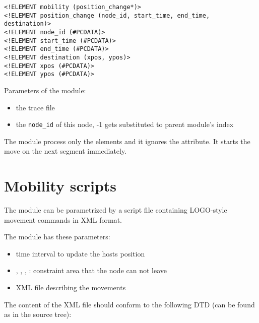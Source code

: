 \begin{description}
\begin{verbatim}
<!ELEMENT mobility (position_change*)>
<!ELEMENT position_change (node_id, start_time, end_time, destination)>
<!ELEMENT node_id (#PCDATA)>
<!ELEMENT start_time (#PCDATA)>
<!ELEMENT end_time (#PCDATA)>
<!ELEMENT destination (xpos, ypos)>
<!ELEMENT xpos (#PCDATA)>
<!ELEMENT ypos (#PCDATA)>
\end{verbatim}

Parameters of the module:

\begin{itemize}
  \item {} the trace file
  \item {} the \verb!node_id! of this node, -1 gets substituted to
  parent module's index
\end{itemize}

\begin{note}
The  module process only the 
elements and it ignores the  attribute. It starts the move
on the next segment immediately.
\end{note}

 
\end{description}




\section{Mobility scripts}

The  module can be parametrized by a script file
containing LOGO-style movement commands in XML format.

The module has these parameters:

\begin{itemize}
\item {} time interval to update the hosts position
\item {}, , ,
      : constraint area that the node can not leave
\item {} XML file describing the movements
\end{itemize}

The content of the XML file should conform to the following DTD (can be
found as  in the source tree):

